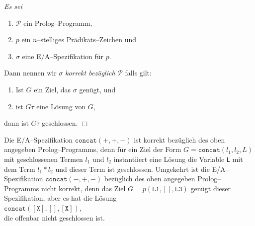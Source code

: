 \begin{Definition} 
{\em
    Es sei
    \begin{enumerate}
    \item  $\mathcal{P}$ ein Prolog--Programm,
    \item  $p$  ein $n$--stelliges Pr\"{a}dikats--Zeichen und
    \item  $\sigma$ eine  E/A--Spezifikation f\"{u}r $p$.
    \end{enumerate}
    Dann nennen wir $\sigma$ \emph{korrekt bez\"{u}glich} $\mathcal{P}$ falls gilt: 
    \begin{enumerate}
    \item Ist $G$ ein Ziel, das $\sigma$ gen\"{u}gt, und
    \item ist $G\tau$ eine L\"{o}sung von $G$,
    \end{enumerate}
    dann ist $G\tau$ geschlossen.
     \hspace*{\fill} $\Box$
} 
\end{Definition}

Die E/A--Spezifikation $\mathtt{concat}(+,+,-)$ ist korrekt bez\"{u}glich des oben
angegeben Prolog--Programms, denn 
 f\"{u}r ein Ziel der Form $G = \texttt{concat}(l_1,l_2,L)$ mit geschlossenen
Termen $l_1$ und $l_2$ instantiiert eine L\"{o}sung die Variable \texttt{L} mit dem Term 
$l_1 * l_2$ und dieser Term ist geschlossen.
 Umgekehrt ist die E/A--Spezifikation
$\mathtt{concat}(-,+,-)$
bez\"{u}glich des oben angegeben Prolog--Programms nicht korrekt,  denn das Ziel
$G = p(\mathtt{L1},[],\mathtt{L3})$ gen\"{u}gt dieser Spezifikation, aber es hat die L\"{o}sung  \\[0.1cm]
\hspace*{1.3cm} $\mathtt{concat}(\mathtt{[X]},[],\mathtt{[X]})$, \\[0.1cm]
die offenbar nicht geschlossen ist.

